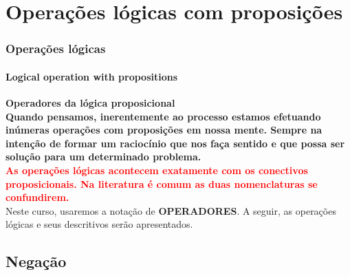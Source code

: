 
\section{Operações lógicas com proposições}
%
\begin{frame}[c]
    \frametitle{Operações lógicas}
    \framesubtitle{Logical operation with propositions}
    \textbf{Operadores da lógica proposicional}\\[2pt]
    \textcolor{green!50!black}{\textbf{Quando pensamos, inerentemente ao processo estamos efetuando inúmeras operações com proposições em nossa mente. Sempre na intenção de formar um raciocínio que nos faça sentido e que possa ser solução para um determinado problema.}}\\[6pt]

    \textcolor{red}{\textbf{As operações lógicas acontecem exatamente com os conectivos proposicionais. Na literatura é comum as duas nomenclaturas se confundirem.}}\\[6pt]
    
    Neste curso, usaremos a notação de \textbf{OPERADORES}. A seguir, as operações lógicas e seus descritivos serão apresentados.

\end{frame}



\subsection{Negação}



